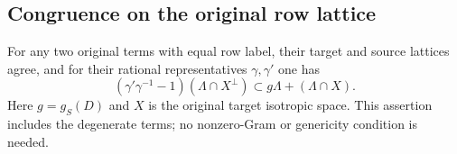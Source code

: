 \subsection{Congruence on the original row lattice}
\label{sec:flag-row-congruence}

\begin{proposition}
\label{prop:flag-row-label-congruence}
For any two original terms with equal row label, their
target and source lattices agree, and for their rational
representatives \(\gamma,\gamma'\) one has
\[
 (\gamma'\gamma^{-1}-1)(\Lambda\cap X^\perp)
 \subset g\Lambda+(\Lambda\cap X).
\]
Here \(g=g_S(D)\) and \(X\) is the original target
isotropic space. This assertion includes the degenerate
terms; no nonzero-Gram or genericity condition is needed.
\end{proposition}

